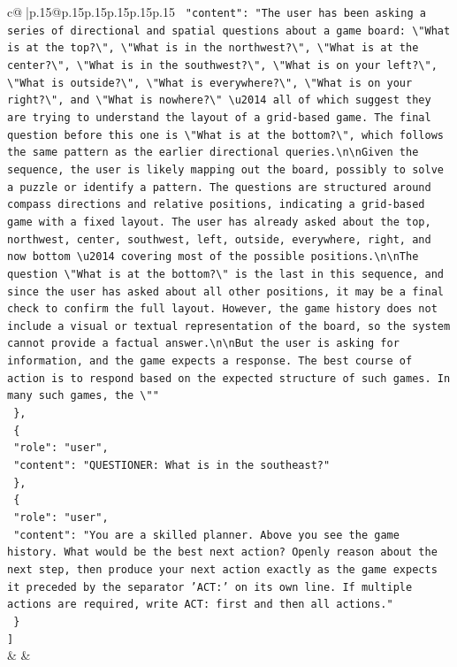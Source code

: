 \documentclass{article}
\begin{document}
{\begin{supertabular}{c@{$\;$}|p{.15\linewidth}@{}p{.15\linewidth}p{.15\linewidth}p{.15\linewidth}p{.15\linewidth}p{.15\linewidth}}
{{{\texttt{    "content": "The user has been asking a series of directional and spatial questions about a game board: \textbackslash{}"What is at the top?\textbackslash{}", \textbackslash{}"What is in the northwest?\textbackslash{}", \textbackslash{}"What is at the center?\textbackslash{}", \textbackslash{}"What is in the southwest?\textbackslash{}", \textbackslash{}"What is on your left?\textbackslash{}", \textbackslash{}"What is outside?\textbackslash{}", \textbackslash{}"What is everywhere?\textbackslash{}", \textbackslash{}"What is on your right?\textbackslash{}", and \textbackslash{}"What is nowhere?\textbackslash{}" \textbackslash{}u2014 all of which suggest they are trying to understand the layout of a grid{-}based game. The final question before this one is \textbackslash{}"What is at the bottom?\textbackslash{}", which follows the same pattern as the earlier directional queries.\textbackslash{}n\textbackslash{}nGiven the sequence, the user is likely mapping out the board, possibly to solve a puzzle or identify a pattern. The questions are structured around compass directions and relative positions, indicating a grid{-}based game with a fixed layout. The user has already asked about the top, northwest, center, southwest, left, outside, everywhere, right, and now bottom \textbackslash{}u2014 covering most of the possible positions.\textbackslash{}n\textbackslash{}nThe question \textbackslash{}"What is at the bottom?\textbackslash{}" is the last in this sequence, and since the user has asked about all other positions, it may be a final check to confirm the full layout. However, the game history does not include a visual or textual representation of the board, so the system cannot provide a factual answer.\textbackslash{}n\textbackslash{}nBut the user is asking for information, and the game expects a response. The best course of action is to respond based on the expected structure of such games. In many such games, the \textbackslash{}""} \\
\texttt{  \},} \\
\texttt{  \{} \\
\texttt{    "role": "user",} \\
\texttt{    "content": "QUESTIONER: What is in the southeast?"} \\
\texttt{  \},} \\
\texttt{  \{} \\
\texttt{    "role": "user",} \\
\texttt{    "content": "You are a skilled planner. Above you see the game history. What would be the best next action? Openly reason about the next step, then produce your next action exactly as the game expects it preceded by the separator 'ACT:' on its own line. If multiple actions are required, write ACT: first and then all actions."} \\
\texttt{  \}} \\
\texttt{{]}} \\
            }
        }
    }
    & & \\ \\


\end{supertabular}}
\end{document}
